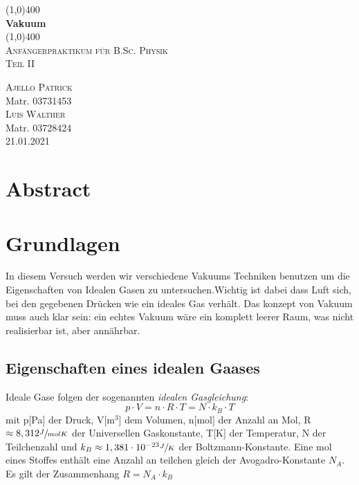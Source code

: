 \documentclass[12pt]{article}
\begin{document}
	\begin{titlepage}
		\begin{center}
		\line(1,0){400}\\
		\vspace{6mm}
		\huge{\bfseries Vakuum}\\
		\vspace{3mm}
		\line(1,0){400}\\
		\textsc{\LARGE Anfängerpraktikum für B.Sc. Physik}\\	
		\textsc{\large Teil II}
		\vspace{10cm}
		\end{center}
		\begin{flushright}
			\textsc{\large Ajello Patrick}\\
			Matr. 03731453\\
			\textsc{\large Luis Walther}\\
			Matr. 03728424\\
			\vspace{2mm}
			21.01.2021
		\end{flushright}
	\end{titlepage}
	
	\tableofcontents
	\thispagestyle{empty}
	\cleardoublepage
	
	\setcounter{page}{1}
	\section{Abstract}\label{sec:abs} 
	\section{Grundlagen}\label{sec:gru}
	In diesem Versuch werden wir verschiedene Vakuums Techniken benutzen um die Eigenschaften von Idealen Gasen zu untersuchen.Wichtig ist dabei dass Luft sich, bei den gegebenen Drücken wie ein ideales Gas verhält. Das konzept von Vakuum muss auch klar sein: ein echtes Vakuum wäre ein komplett leerer Raum, was nicht realisierbar ist, aber annährbar.
	\subsection{Eigenschaften eines idealen Gaases}
	Ideale Gase folgen der sogenannten \textit{idealen Gasgleichung}:
	\begin{equation} \label{eq: ideale gasgleichung}
	p\cdot V=n \cdot R \cdot T= N \cdot k_B \cdot T
	\end{equation}
	mit p[Pa] der Druck, V[m$^3$] dem Volumen, n[mol] der Anzahl an Mol, R $\approx 8,312 \sfrac {J}{ mol K}$ der Universellen Gaskonstante, T[K] der Temperatur, N der Teilchenzahl und $k_B \approx 1,381 \cdot 10^{-23} \sfrac{J}{K}$ der Boltzmann-Konstante. Eine mol eines Stoffes enthält eine Anzahl an teilchen gleich der Avogadro-Konstante $N_A$. Es gilt der Zusammenhang $R=N_A \cdot k_B$
\end{document}
